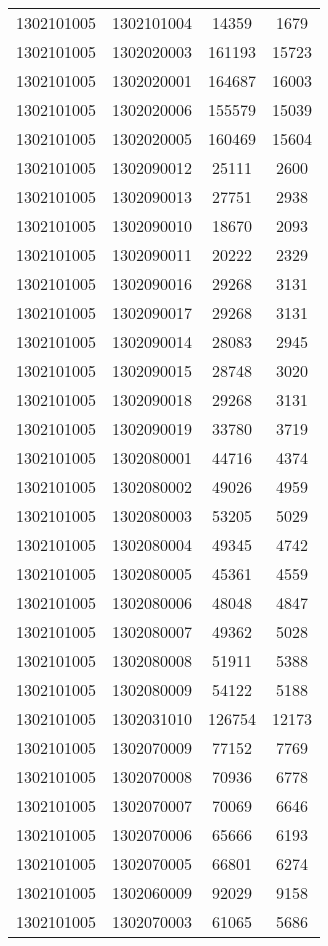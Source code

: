 \begin{longtable}[h]{llcc}
		1302101005 & 1302101004 & 14359 & 1679\\
		1302101005 & 1302020003 & 161193 & 15723\\
		1302101005 & 1302020001 & 164687 & 16003\\
		1302101005 & 1302020006 & 155579 & 15039\\
		1302101005 & 1302020005 & 160469 & 15604\\
		1302101005 & 1302090012 & 25111 & 2600\\
		1302101005 & 1302090013 & 27751 & 2938\\
		1302101005 & 1302090010 & 18670 & 2093\\
		1302101005 & 1302090011 & 20222 & 2329\\
		1302101005 & 1302090016 & 29268 & 3131\\
		1302101005 & 1302090017 & 29268 & 3131\\
		1302101005 & 1302090014 & 28083 & 2945\\
		1302101005 & 1302090015 & 28748 & 3020\\
		1302101005 & 1302090018 & 29268 & 3131\\
		1302101005 & 1302090019 & 33780 & 3719\\
		1302101005 & 1302080001 & 44716 & 4374\\
		1302101005 & 1302080002 & 49026 & 4959\\
		1302101005 & 1302080003 & 53205 & 5029\\
		1302101005 & 1302080004 & 49345 & 4742\\
		1302101005 & 1302080005 & 45361 & 4559\\
		1302101005 & 1302080006 & 48048 & 4847\\
		1302101005 & 1302080007 & 49362 & 5028\\
		1302101005 & 1302080008 & 51911 & 5388\\
		1302101005 & 1302080009 & 54122 & 5188\\
		1302101005 & 1302031010 & 126754 & 12173\\
		1302101005 & 1302070009 & 77152 & 7769\\
		1302101005 & 1302070008 & 70936 & 6778\\
		1302101005 & 1302070007 & 70069 & 6646\\
		1302101005 & 1302070006 & 65666 & 6193\\
		1302101005 & 1302070005 & 66801 & 6274\\
		1302101005 & 1302060009 & 92029 & 9158\\
		1302101005 & 1302070003 & 61065 & 5686\\

\end{longtable}

